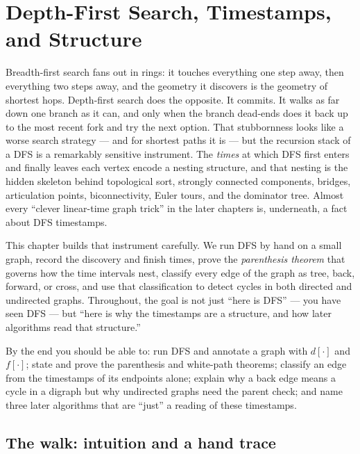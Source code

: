 \chapter{Depth-First Search, Timestamps, and Structure}

\chapterline

Breadth-first search fans out in rings: it touches everything one step away, then everything two steps away, and the geometry it discovers is the geometry of shortest hops. Depth-first search does the opposite. It commits. It walks as far down one branch as it can, and only when the branch dead-ends does it back up to the most recent fork and try the next option. That stubbornness looks like a worse search strategy --- and for shortest paths it is --- but the recursion stack of a DFS is a remarkably sensitive instrument. The \emph{times} at which DFS first enters and finally leaves each vertex encode a nesting structure, and that nesting is the hidden skeleton behind topological sort, strongly connected components, bridges, articulation points, biconnectivity, Euler tours, and the dominator tree. Almost every ``clever linear-time graph trick'' in the later chapters is, underneath, a fact about DFS timestamps.

This chapter builds that instrument carefully. We run DFS by hand on a small graph, record the discovery and finish times, prove the \emph{parenthesis theorem} that governs how the time intervals nest, classify every edge of the graph as tree, back, forward, or cross, and use that classification to detect cycles in both directed and undirected graphs. Throughout, the goal is not just ``here is DFS'' --- you have seen DFS --- but ``here is why the timestamps are a structure, and how later algorithms read that structure.''

\begin{focusbox}
By the end you should be able to: run DFS and annotate a graph with $d[\cdot]$ and $f[\cdot]$; state and prove the parenthesis and white-path theorems; classify an edge from the timestamps of its endpoints alone; explain why a back edge means a cycle in a digraph but why undirected graphs need the parent check; and name three later algorithms that are ``just'' a reading of these timestamps.
\end{focusbox}

\section{The walk: intuition and a hand trace}
\label{ch03:intuition}

